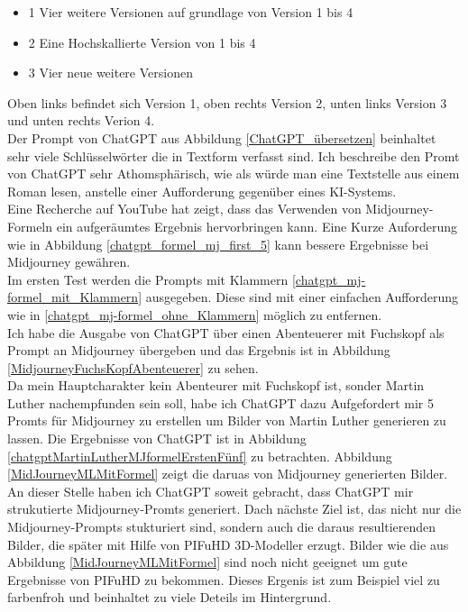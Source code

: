 \begin{itemize}
	\item 1 Vier weitere Versionen auf grundlage von Version 1 bis 4
	\item 2 Eine Hochskallierte Version von 1 bis 4
	\item 3 Vier neue weitere Versionen
\end{itemize}
Oben links befindet sich Version 1, oben rechts Version 2, unten links Version 3 und unten rechts Verion 4.
\\
Der Prompt von ChatGPT aus Abbildung \ref{ChatGPT_übersetzen} beinhaltet sehr viele Schlüsselwörter die in Textform verfasst sind. Ich beschreibe den Promt von ChatGPT sehr Athomsphärisch, wie als würde man eine Textstelle aus einem Roman lesen, anstelle einer Aufforderung gegenüber eines KI-Systems.
\\
Eine Recherche auf YouTube hat zeigt, dass das Verwenden von Midjourney-Formeln ein aufgeräumtes Ergebnis hervorbringen kann. Eine Kurze Auforderung wie in Abbildung \ref{chatgpt_formel_mj_first_5} kann bessere Ergebnisse bei Midjourney gewähren.
\\
Im ersten Test werden die Prompts mit Klammern \ref{chatgpt_mj-formel_mit_Klammern} ausgegeben. Diese sind mit einer einfachen Aufforderung wie in \ref{chatgpt_mj-formel_ohne_Klammern} möglich zu entfernen.
\\
Ich habe die Ausgabe von ChatGPT über einen Abenteuerer mit Fuchskopf als Prompt an Midjourney übergeben und das Ergebnis ist in Abbildung \ref{MidjourneyFuchsKopfAbenteuerer} zu sehen.
\\
Da mein Hauptcharakter kein Abenteurer mit Fuchskopf ist, sonder Martin Luther nachempfunden sein soll, habe ich ChatGPT dazu Aufgefordert mir 5 Promts für Midjourney zu erstellen um Bilder von Martin Luther generieren zu lassen. Die Ergebnisse von ChatGPT ist in Abbildung \ref{chatgptMartinLutherMJformelErstenFünf} zu betrachten. Abbildung \ref{MidJourneyMLMitFormel} zeigt die daruas von Midjourney generierten Bilder.
\\
An dieser Stelle haben ich ChatGPT soweit gebracht, dass ChatGPT mir strukutierte Midjourney-Promts generiert. Dach nächste Ziel ist, das nicht nur die Midjourney-Prompts stukturiert sind, sondern auch die daraus resultierenden Bilder, die später mit Hilfe von PIFuHD 3D-Modeller erzugt. Bilder wie die aus Abbildung  \ref{MidJourneyMLMitFormel} sind noch nicht geeignet um gute Ergebnisse von PIFuHD zu bekommen. Dieses Ergenis ist zum Beispiel viel zu farbenfroh und beinhaltet zu viele Deteils im Hintergrund.
